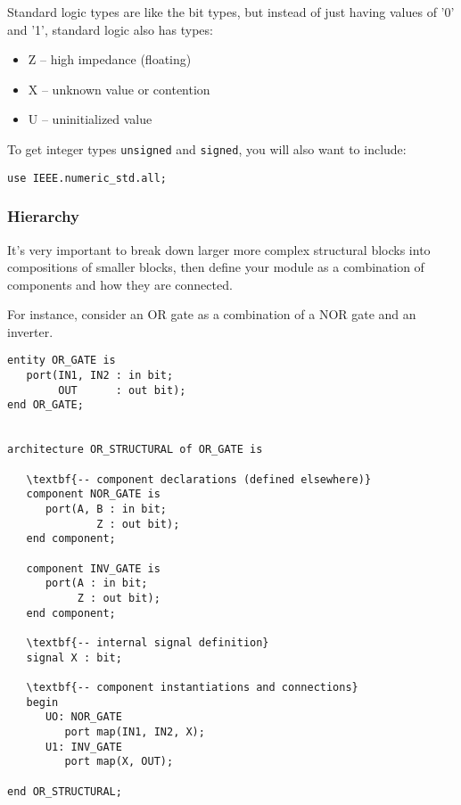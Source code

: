 \documentclass{IEEEtran}
\begin{document}
Standard logic types are like the bit types, but instead of just having values of '0' and '1', standard logic also has types:

\begin{itemize}
\item Z -- high impedance (floating)
\item X -- unknown value or contention
\item U -- uninitialized value 
\end{itemize}

To get integer types \verb|unsigned| and \verb|signed|, you will also want to include:

\begin{Verbatim}[fontsize=\scriptsize, xleftmargin=.3in, commandchars=\\\{\}]
use IEEE.numeric_std.all;
\end{Verbatim}

\subsubsection{Hierarchy}

It's very important to break down larger more complex structural blocks into compositions of smaller blocks, then define your module as a combination of components and how they are connected.

For instance, consider an OR gate as a combination of a NOR gate and an inverter.


\begin{Verbatim}[fontsize=\scriptsize, xleftmargin=.3in, commandchars=\\\{\}]
entity OR_GATE is 
   port(IN1, IN2 : in bit;
        OUT      : out bit);
end OR_GATE;


architecture OR_STRUCTURAL of OR_GATE is
   
   \textbf{-- component declarations (defined elsewhere)}
   component NOR_GATE is
   	  port(A, B : in bit;
   	          Z : out bit);
   end component;
   
   component INV_GATE is
   	  port(A : in bit; 
   	       Z : out bit);
   end component;

   \textbf{-- internal signal definition}
   signal X : bit;
   
   \textbf{-- component instantiations and connections}
   begin
      UO: NOR_GATE 
         port map(IN1, IN2, X);
      U1: INV_GATE
         port map(X, OUT);

end OR_STRUCTURAL;
\end{Verbatim}
\end{document}

